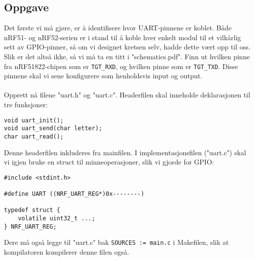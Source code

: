 \documentclass[11pt,a4paper]{article}
\begin{document}
\subsection{Oppgave}
Det første vi må gjøre, er å identifisere hvor UART-pinnene er koblet. Både nRF51- og nRF52-serien er i stand til å koble hver enkelt modul til et vilkårlig sett av GPIO-pinner, så om vi designet kretsen selv, hadde dette vært opp til oss.\\
Slik er det altså ikke, så vi må ta en titt i "schematics.pdf". Finn ut hvilken pinne fra nRF51822-chipen som er \texttt{TGT_RXD}, og hvilken pinne som er \texttt{TGT_TXD}. Disse pinnene skal vi sene konfigurere som henholdsvis input og output.\\
\\
Opprett nå filene "uart.h" og "uart.c". Headerfilen skal inneholde deklarasjonen til tre funksjoner:
\begin{verbatim}
void uart_init();
void uart_send(char letter);
char uart_read();
\end{verbatim}
Denne headerfilen inkluderes fra mainfilen. I implementasjonsfilen ("uart.c") skal vi igjen bruke en struct til minneoperasjoner, slik vi gjorde for GPIO:
\begin{verbatim}
#include <stdint.h>

#define UART ((NRF_UART_REG*)0x--------)

typedef struct {
	volatile uint32_t ...;
} NRF_UART_REG;
\end{verbatim}
Dere må også legge til "uart.c" bak \texttt{SOURCES := main.c} i Makefilen, slik at kompilatoren kompilerer denne filen også.
\end{document}
